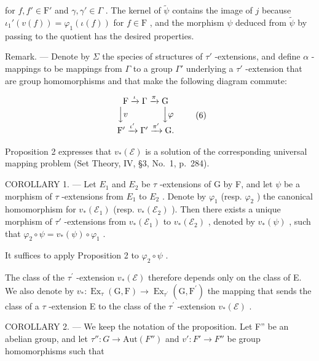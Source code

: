 for \(f, f' \in \mathrm{F}'\) and \(\gamma, \gamma' \in \Gamma\) . The kernel of \(\widetilde{\psi}\) contains the image of \(j\) because \(\iota_1'(v(f)) = \varphi_1(\iota(f))\) for \(f \in \mathrm{F}\) , and the morphism \(\psi\) deduced from \(\widetilde{\psi}\) by passing to the quotient has the desired properties.

Remark. --- Denote by \(\Sigma\) the species of structures of \(\tau'\) -extensions, and define \(\alpha\) -mappings to be mappings from \(\Gamma\) to a group \(\Gamma'\) underlying a \(\tau'\) -extension that are group homomorphisms and that make the following diagram commute:

\[
\begin{array}{c} \mathrm{F} \xrightarrow {\iota} \Gamma \xrightarrow {\pi} \mathrm{G} \\ \Big \downarrow v \qquad \qquad \Big \downarrow \varphi \\ \mathrm{F} ^ {\prime} \xrightarrow {\iota^ {\prime}} \Gamma^ {\prime} \xrightarrow {\pi^ {\prime}} \mathrm{G}. \end{array}\tag{6}
\]

Proposition 2 expresses that \(v_{*}(\mathcal{E})\) is a solution of the corresponding universal mapping problem (Set Theory, IV, §3, No.~1, p.~284).

COROLLARY 1. --- Let \(E_{1}\) and \(E_{2}\) be \(\tau\) -extensions of G by F, and let \(\psi\) be a morphism of \(\tau\) -extensions from \(E_{1}\) to \(E_{2}\) . Denote by \(\varphi_{1}\) (resp. \(\varphi_{2}\) ) the canonical homomorphism for \(v_{*}(\mathcal{E}_{1})\) (resp. \(v_{*}(\mathcal{E}_{2})\) ). Then there exists a unique morphism of \(\tau'\) -extensions from \(v_{*}(\mathcal{E}_{1})\) to \(v_{*}(\mathcal{E}_{2})\) , denoted by \(v_{*}(\psi)\) , such that \(\varphi_{2} \circ \psi = v_{*}(\psi) \circ \varphi_{1}\) .

It suffices to apply Proposition 2 to \(\varphi_{2} \circ \psi\) .

The class of the \(\tau^{\prime}\) -extension \(v_{*}(\mathcal{E})\) therefore depends only on the class of E. We also denote by \(v_{*}:\operatorname{Ex}_{\tau}(\mathrm{G},\mathrm{F})\to\operatorname{Ex}_{\tau^{\prime}}(\mathrm{G},\mathrm{F}^{\prime})\) the mapping that sends the class of a \(\tau\) -extension E to the class of the \(\tau^{\prime}\) -extension \(v_{*}(\mathcal{E})\) .

COROLLARY 2. --- We keep the notation of the proposition. Let F'' be an abelian group, and let \(\tau'' : G \to \text{Aut}(F'')\) and \(v': F' \to F''\) be group homomorphisms such that

